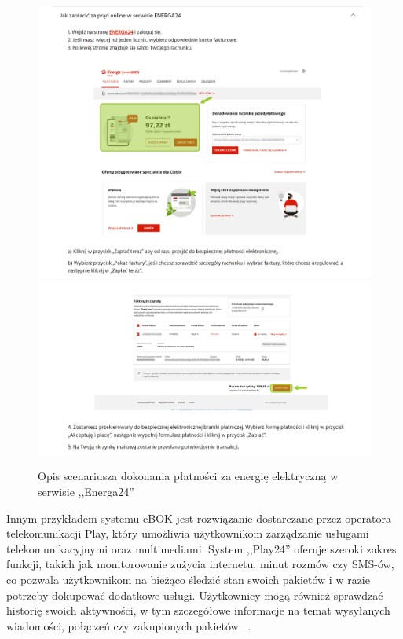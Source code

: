 \begin{figure}[htb]
	\centering
		\includegraphics[width=0.85\linewidth]{zrzuty_ekranu/energa_manual_1.png} \\[-1ex]
		\includegraphics[width=0.85\linewidth]{zrzuty_ekranu/energa_manual_2.png} \\[-1ex]
		\caption{Opis scenariusza dokonania płatności za energię elektryczną w serwisie ,,Energa24''~\cite{energa}}
	\label{fig:energa_manual}
\end{figure}

Innym przykładem systemu eBOK jest rozwiązanie dostarczane przez operatora telekomunikacji Play, który umożliwia użytkownikom zarządzanie usługami telekomunikacyjnymi oraz multimediami. System ,,Play24'' oferuje szeroki zakres funkcji, takich jak monitorowanie zużycia internetu, minut rozmów czy SMS-ów, co pozwala użytkownikom na bieżąco śledzić stan swoich pakietów i w razie potrzeby dokupować dodatkowe usługi. Użytkownicy mogą również sprawdzać historię swoich aktywności, w tym szczegółowe informacje na temat wysyłanych wiadomości, połączeń czy zakupionych pakietów ~\cite{Play24}.

